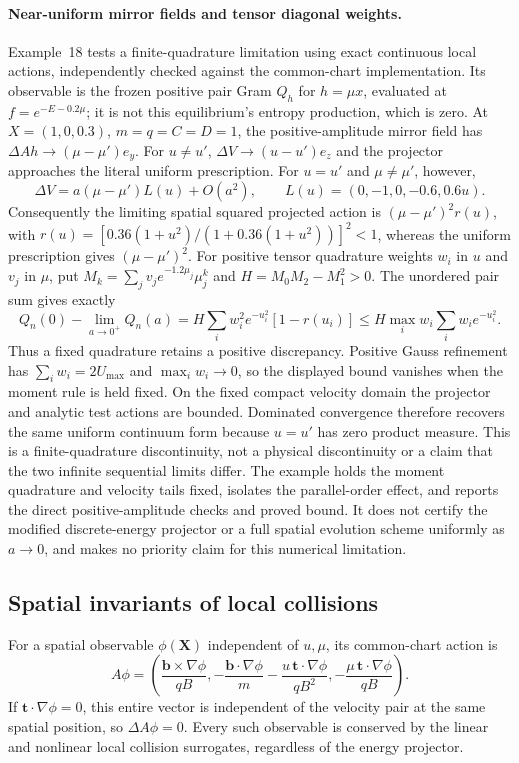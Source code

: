 \documentclass[11pt,letterpaper]{article}
\newcommand{\X}{\mathbf X}
\begin{document}
\paragraph{Near-uniform mirror fields and tensor diagonal weights.}
Example~18 tests a finite-quadrature limitation using exact continuous local
actions, independently checked against the common-chart implementation. Its
observable is the frozen positive pair Gram $Q_h$ for $h=\mu x$, evaluated
at $f=e^{-E-0.2\mu}$; it is not this equilibrium's entropy production, which
is zero. At $X=(1,0,0.3)$, $m=q=C=D=1$, the positive-amplitude mirror field
has $\Delta A h\to(\mu-\mu')e_y$. For $u\ne u'$, $\Delta V\to(u-u')e_z$
and the projector approaches the literal uniform prescription. For $u=u'$
and $\mu\ne\mu'$, however,
\[
 \Delta V=a(\mu-\mu')L(u)+O(a^2),\qquad
 L(u)=(0,-1,0,-0.6,0.6u).
\]
Consequently the limiting spatial squared projected action is
$(\mu-\mu')^2r(u)$, with
$r(u)=[0.36(1+u^2)/(1+0.36(1+u^2))]^2<1$, whereas the uniform prescription
gives $(\mu-\mu')^2$. For positive tensor quadrature weights $w_i$ in $u$
and $v_j$ in $\mu$, put $M_k=\sum_j v_je^{-1.2\mu_j}\mu_j^k$ and
$H=M_0M_2-M_1^2>0$. The unordered pair sum gives exactly
\[
 Q_n(0)-\lim_{a\to0^+}Q_n(a)
 =H\sum_i w_i^2e^{-u_i^2}[1-r(u_i)]
 \le H\max_iw_i\sum_iw_ie^{-u_i^2}.
\]
Thus a fixed quadrature retains a positive discrepancy. Positive Gauss
refinement has $\sum_iw_i=2U_{\max}$ and $\max_iw_i\to0$, so the
displayed bound vanishes when the moment rule is held fixed. On the fixed compact velocity domain the
projector and analytic test actions are bounded. Dominated convergence
therefore recovers the same uniform continuum form because $u=u'$ has zero
product measure. This is a finite-quadrature discontinuity, not a physical
discontinuity or a claim that the two infinite sequential limits differ.
The example holds the moment quadrature and velocity tails fixed, isolates
the parallel-order effect, and reports the direct positive-amplitude checks
and proved bound. It does not certify the modified discrete-energy projector
or a full spatial evolution scheme uniformly as $a\to0$, and makes no
priority claim for this numerical limitation.

\subsection*{Spatial invariants of local collisions}
For a spatial observable $\phi(\X)$ independent of $u,\mu$, its common-chart
action is
\begin{equation}
 A\phi=\left(\frac{\mathbf b\times\nabla\phi}{qB},
 -\frac{\mathbf b\cdot\nabla\phi}{m}
 -\frac{u\,\mathbf t\cdot\nabla\phi}{qB^2},
 -\frac{\mu\,\mathbf t\cdot\nabla\phi}{qB}\right).
 \label{eq:vacuumspatialaction}
\end{equation}
If $\mathbf t\cdot\nabla\phi=0$, this entire vector is independent of the
velocity pair at the same spatial position, so $\Delta A\phi=0$.
Every such observable is conserved by the linear and nonlinear local
collision surrogates, regardless of the energy projector.
\end{document}
